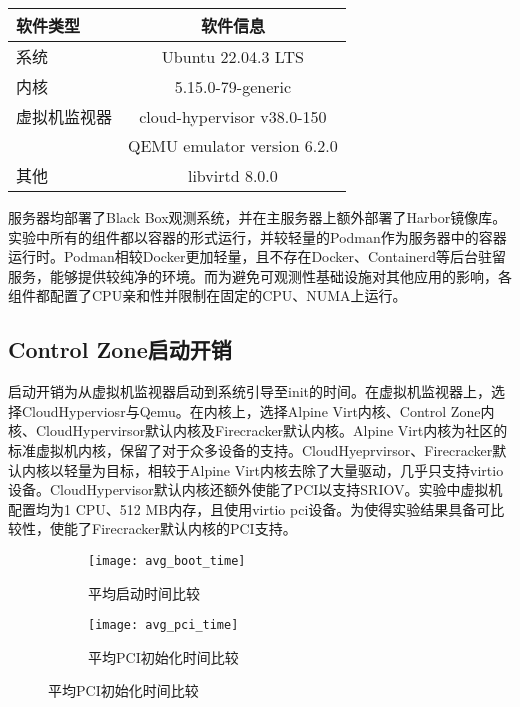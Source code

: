 \begin{table}[H]
    \label{tab:system_env}
    \footnotesize%
    \setlength{\tabcolsep}{30pt}%
    \renewcommand{\arraystretch}{1.25}%
    \centering
    \begin{tabular}{lc}
        \hline
        软件类型 & 软件信息 \\
        \hline
        系统 & Ubuntu 22.04.3 LTS  \\
        内核 & 5.15.0-79-generic \\
        虚拟机监视器 & cloud-hypervisor v38.0-150 \\
                   & QEMU emulator version 6.2.0 \\
        其他        & libvirtd 8.0.0 \\
        \hline
    \end{tabular}
\end{table}

服务器均部署了Black Box观测系统，并在主服务器上额外部署了Harbor镜像库。实验中所有的组件都以容器的形式运行，并较轻量的Podman作为服务器中的容器运行时。Podman相较Docker更加轻量，且不存在Docker、Containerd等后台驻留服务，能够提供较纯净的环境。而为避免可观测性基础设施对其他应用的影响，各组件都配置了CPU亲和性并限制在固定的CPU、NUMA上运行。

\subsection{Control Zone启动开销}

启动开销为从虚拟机监视器启动到系统引导至init的时间。在虚拟机监视器上，选择CloudHyperviosr与Qemu。在内核上，选择Alpine Virt内核、Control Zone内核、CloudHypervirsor默认内核及Firecracker默认内核。Alpine Virt内核为社区的标准虚拟机内核，保留了对于众多设备的支持。CloudHyeprvirsor、Firecracker默认内核以轻量为目标，相较于Alpine Virt内核去除了大量驱动，几乎只支持virtio设备。CloudHypervisor默认内核还额外使能了PCI以支持SRIOV。实验中虚拟机配置均为1 CPU、512 MB内存，且使用virtio pci设备。为使得实验结果具备可比较性，使能了Firecracker默认内核的PCI支持。


\begin{figure}[H]
    \centering
    \begin{subfigure}[b]{0.45\textwidth}
        \texttt{[image: avg\_boot\_time]}
        \caption{\quad 平均启动时间比较}
        \label{fig:avg_boot_time}
    \end{subfigure}
    \begin{subfigure}[b]{0.45\textwidth}
        \texttt{[image: avg\_pci\_time]}
        \caption{\quad 平均PCI初始化时间比较}
        \label{fig:avg_pci_time}
    \end{subfigure}

    \label{fig:avg_startup_time}

\end{figure}

